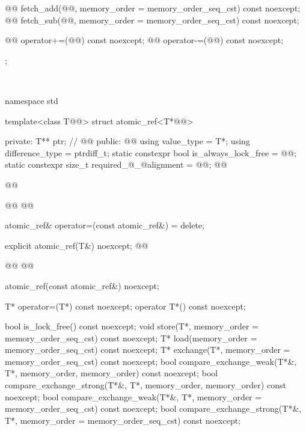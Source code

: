 \begin{codeblock}
{{    @@ fetch_add(@@,
                             memory_order = memory_order_seq_cst) const noexcept;
    @@ fetch_sub(@@,
                             memory_order = memory_order_seq_cst) const noexcept;

    @@ operator+=(@@) const noexcept;
    @@ operator-=(@@) const noexcept;
  };
}
\end{codeblock}

 \\

\begin{codeblock}
namespace std {
  template<class T@@> struct atomic_ref<T*@@> {
  private:
    T** ptr; // \expos
    @@
  public:
    @@
    using value_type = T*;
    using difference_type = ptrdiff_t;
    static constexpr bool is_always_lock_free = @@;
    static constexpr size_t required_@_@alignment = @@;
    @@
    
    @@

    @@
    @@

    atomic_ref& operator=(const atomic_ref&) = delete;

    explicit atomic_ref(T&) noexcept;
    @@
   
    @@
    @@
    
    atomic_ref(const atomic_ref&) noexcept;

    T* operator=(T*) const noexcept;
    operator T*() const noexcept;

    bool is_lock_free() const noexcept;
    void store(T*, memory_order = memory_order_seq_cst) const noexcept;
    T* load(memory_order = memory_order_seq_cst) const noexcept;
    T* exchange(T*, memory_order = memory_order_seq_cst) const noexcept;
    bool compare_exchange_weak(T*&, T*,
                               memory_order, memory_order) const noexcept;
    bool compare_exchange_strong(T*&, T*,
                                 memory_order, memory_order) const noexcept;
    bool compare_exchange_weak(T*&, T*,
                               memory_order = memory_order_seq_cst) const noexcept;
    bool compare_exchange_strong(T*&, T*,
                                 memory_order = memory_order_seq_cst) const noexcept;

}}
\end{codeblock}
